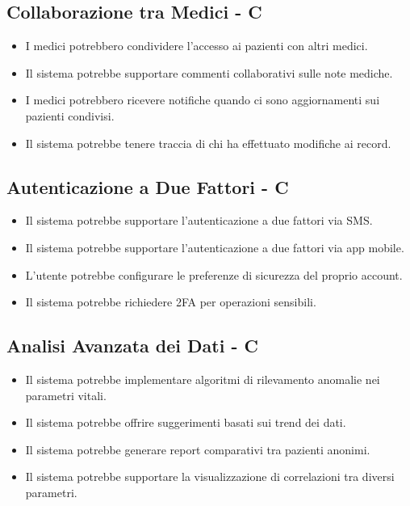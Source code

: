 \documentclass[12pt,a4paper,oneside]{report}
\begin{document}
\subsection{Collaborazione tra Medici  - C}

\begin{itemize}
    \item I medici potrebbero condividere l'accesso ai pazienti con altri medici.
    \item Il sistema potrebbe supportare commenti collaborativi sulle note mediche.
    \item I medici potrebbero ricevere notifiche quando ci sono aggiornamenti sui pazienti condivisi.
    \item Il sistema potrebbe tenere traccia di chi ha effettuato modifiche ai record.
\end{itemize}

\subsection{Autenticazione a Due Fattori  - C}

\begin{itemize}
    \item Il sistema potrebbe supportare l'autenticazione a due fattori via SMS.
    \item Il sistema potrebbe supportare l'autenticazione a due fattori via app mobile.
    \item L'utente potrebbe configurare le preferenze di sicurezza del proprio account.
    \item Il sistema potrebbe richiedere 2FA per operazioni sensibili.
\end{itemize}

\subsection{Analisi Avanzata dei Dati  - C}

\begin{itemize}
    \item Il sistema potrebbe implementare algoritmi di rilevamento anomalie nei parametri vitali.
    \item Il sistema potrebbe offrire suggerimenti basati sui trend dei dati.
    \item Il sistema potrebbe generare report comparativi tra pazienti anonimi.
    \item Il sistema potrebbe supportare la visualizzazione di correlazioni tra diversi parametri.
\end{itemize}
\end{document}

